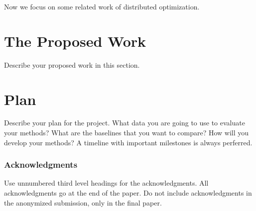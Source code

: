\documentclass{article}
\begin{document}
Now we focus on some related work of distributed optimization.

\section{The Proposed Work}
Describe your proposed work in this section. 



\section{Plan}
Describe your plan for the project. What data you are going to use to evaluate your methods? What are the baselines that you want to compare? How will you develop your methods?   A timeline with important milestones is always perferred. 


\subsubsection*{Acknowledgments}

Use unnumbered third level headings for the acknowledgments. All
acknowledgments go at the end of the paper. Do not include
acknowledgments in the anonymized submission, only in the final paper.


%
%
%
%
%


\end{document}
